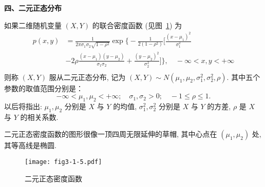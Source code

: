 \textbf{四、二元正态分布}

如果二维随机变量 $(X,Y)$ 的联合密度函数 (见图~\ref{fig:3.1.5}) 为
	\begin{equation}\label{eq:3.1.8}
	\begin{aligned} 
	p(x, y) &=\frac{1}{2 \pi \sigma_{1} \sigma_{2} \sqrt{1-\rho^{2}}} \exp \bigg\{-\frac{1}{2\left(1-\rho^{2}\right)}
	\bigg[\frac{\left(x-\mu_{1}\right)^{2}}{\sigma_{1}^{2}}		\\
	&-2 \rho \frac{\left(x-\mu_{1}\right)\left(y-\mu_{2}\right)}{\sigma_{1} \sigma_{2}}+\frac{\left(y-\mu_{2}\right)^{2}}{\sigma_{2}^{2}} 
	\bigg] \bigg\}, \quad-\infty<x, y<+\infty \\
	\end{aligned}
	\end{equation}
则称 $(X,Y)$ 服从二元正态分布, 记为 $(X,Y)\sim N(\mu_1,\mu_2,\sigma_1^2,\sigma_2^2,\rho)$. 其中五个参数的取值范围分别是：
	\[
	 	-\infty<\mu_{1}, \mu_{2}<+\infty; \quad \sigma_{1}, \sigma_{2}>0 ; \quad-1 \leq \rho \leq 1.
	\]
	以后将指出: $\mu_1,\mu_2$ 分别是 $X$ 与 $Y$ 的均值, $\sigma_1^2,\sigma_2^2$ 分别是 $X$ 与 $Y$ 的方差, $\rho$ 是
	 $X$ 与 $Y$ 的相关系数.

	 二元正态密度函数的图形很像一顶四周无限延伸的草帽, 其中心点在 $(\mu_1,\mu_2)$ 处, 其等高线是椭圆.

	 \begin{figure}[htbp]
	 	\centering
	 	\texttt{[image: fig3-1-5.pdf]}
	 	\caption{二元正态密度函数}\label{fig:3.1.5}
	 \end{figure}

